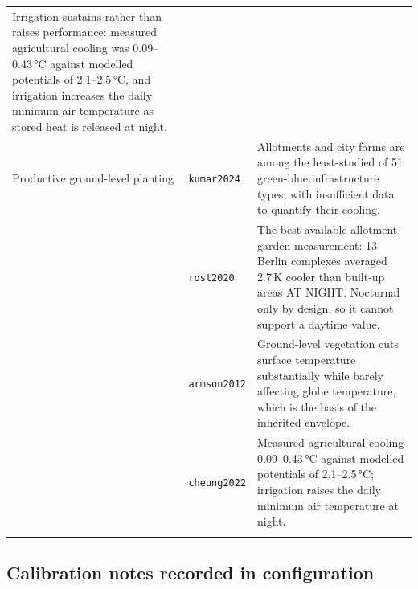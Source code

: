 \begin{longtable}{@{}>{\raggedright\arraybackslash}p{30mm} l
                    >{\raggedright\arraybackslash}p{72mm}@{}}
Irrigation sustains rather than raises performance: measured agricultural cooling was 0.09--0.43\,\si{\degreeCelsius} against modelled potentials of 2.1--2.5\,\si{\degreeCelsius}, and irrigation increases the daily minimum air temperature as stored heat is released at night. \\
\addlinespace
Productive ground-level planting & \texttt{kumar2024} &
Allotments and city farms are among the least-studied of 51 green-blue infrastructure types, with insufficient data to quantify their cooling. \\
 & \texttt{rost2020} &
The best available allotment-garden measurement: 13 Berlin complexes averaged 2.7\,\si{\kelvin} cooler than built-up areas AT NIGHT. Nocturnal only by design, so it cannot support a daytime value. \\
 & \texttt{armson2012} &
Ground-level vegetation cuts surface temperature substantially while barely affecting globe temperature, which is the basis of the inherited envelope. \\
 & \texttt{cheung2022} &
Measured agricultural cooling 0.09--0.43\,\si{\degreeCelsius} against modelled potentials of 2.1--2.5\,\si{\degreeCelsius}; irrigation raises the daily minimum air temperature at night. \\
\addlinespace
\end{longtable}

\subsection{Calibration notes recorded in configuration}

